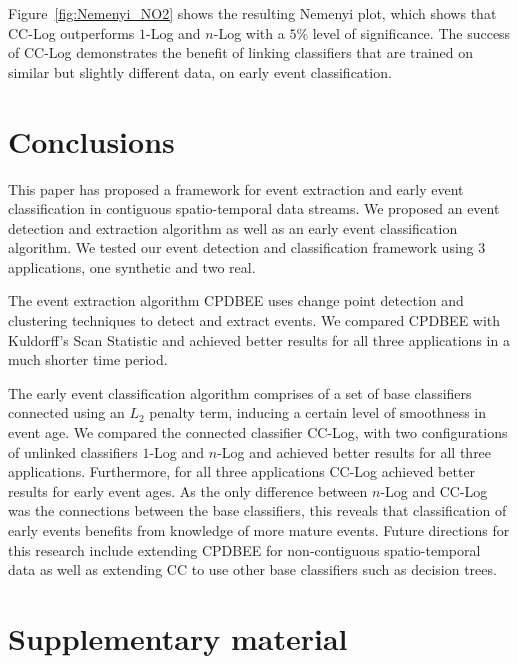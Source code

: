 \documentclass[a4paper,11pt]{article}
\begin{document}
Figure~\ref{fig:Nemenyi_NO2} shows the resulting Nemenyi plot, which shows that CC-Log outperforms $1$-Log and $n$-Log with a $5\%$ level of significance. The success of CC-Log demonstrates the benefit of linking classifiers that are trained on similar but slightly different data, on early event classification.

\section{Conclusions}\label{sec:Conclusions}

This paper has proposed a framework for event extraction and early event classification in contiguous spatio-temporal data streams. We  proposed an event detection and extraction algorithm as well as an early event classification algorithm. We  tested our event detection and classification framework using 3 applications, one synthetic and two real.

The event extraction algorithm CPDBEE uses change point detection and clustering techniques to detect and extract events. We compared CPDBEE with Kuldorff's Scan Statistic and achieved better results for all three applications in a much shorter time period.

The early event classification algorithm comprises of a set of base classifiers connected using an $L_2$ penalty term, inducing a certain level of smoothness in event age. We compared the connected classifier CC-Log, with two configurations of unlinked classifiers $1$-Log and $n$-Log and achieved better results for all three applications. Furthermore, for all three applications CC-Log achieved better results for early event ages. As the only difference between $n$-Log and CC-Log was the connections between the base classifiers, this reveals that classification of early events benefits from knowledge of more mature events. Future directions for this research include extending CPDBEE for non-contiguous spatio-temporal data as well as extending CC to use other base classifiers such as decision trees.

\section{Supplementary material}\label{sec:supmat}
\end{document}
